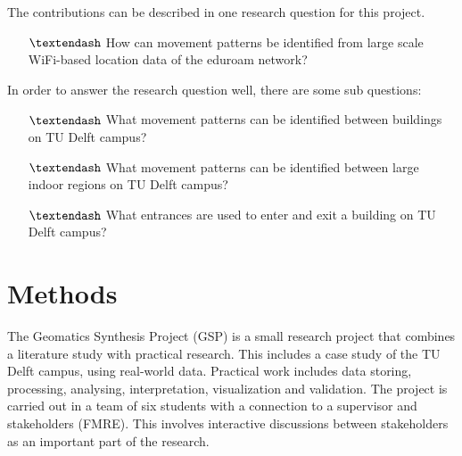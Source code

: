 The contributions can be described in one research question for this project.
\begin{itemize}
\item[$\textendash$] How can movement patterns be identified from large scale WiFi-based location data of the eduroam network?
\end{itemize}
In order to answer the research question well, there are some sub questions:
\begin{itemize}
\item[$\textendash$] What movement patterns can be identified between buildings on TU Delft campus?
\item[$\textendash$] What movement patterns can be identified between large indoor regions on TU Delft campus?
\item[$\textendash$] What entrances are used to enter and exit a building on TU Delft campus?
\end{itemize}

\section{Methods}\label{methods}
The Geomatics Synthesis Project (GSP) is a small research project that combines a literature study with practical research. This includes a case study of the TU Delft campus, using real-world data. Practical work includes data storing, processing, analysing, interpretation, visualization and validation. The project is carried out in a team of six students with a connection to a supervisor and stakeholders (FMRE). This involves interactive discussions between stakeholders as an important part of the research. 
